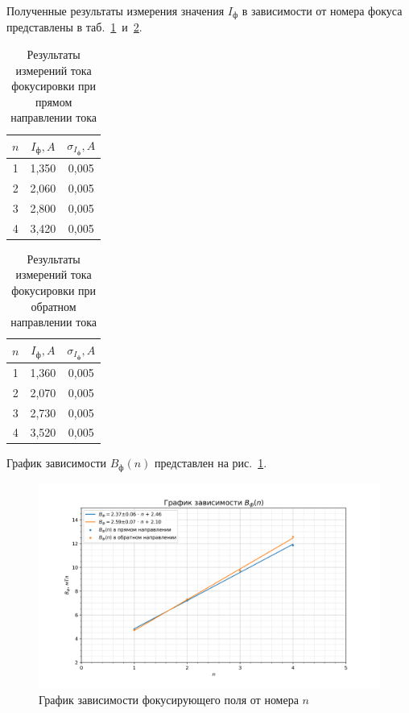 \documentclass[a4paper, 12pt]{article}
\begin{document}
\vspace{6cm}

Полученные результаты измерения значения $I_ф$ в зависимости от номера фокуса представлены в таб.~\ref{tab3}~и~\ref{tab4}.

\begin{table}[h!]
\begin{center}
\begin{tabular}{|c|c|c|}
\hline
$n$ & $I_ф, A$ & $\sigma_{I_ф}, A$ \\ [0.1cm] \hline
1   & 1,350  & 0,005   \\ \hline
2   & 2,060  & 0,005   \\ \hline
3   & 2,800  & 0,005   \\ \hline
4   & 3,420  & 0,005   \\ \hline
\end{tabular}
\end{center}
\caption{Результаты измерений тока фокусировки при прямом направлении тока}
\label{tab3}
\end{table}

\begin{table}[h!]
\begin{center}
\begin{tabular}{|c|c|c|}
\hline
$n$ & $I_ф, A$ & $\sigma_{I_ф}, A$ \\ [0.1cm] \hline
1   & 1,360  & 0,005   \\ \hline
2   & 2,070  & 0,005   \\ \hline
3   & 2,730  & 0,005   \\ \hline
4   & 3,520  & 0,005   \\ \hline
\end{tabular}
\end{center}
\caption{Результаты измерений тока фокусировки при обратном направлении тока}
\label{tab4}
\end{table}

График зависимости $B_{ф}(n)$ представлен на рис.~\ref{ris3}.

\begin{figure}[h!]
\begin{flushleft}
    \includegraphics[scale=0.7]{3.3.1_2.png}
\end{flushleft}
\caption{График зависимости фокусирующего поля от номера $n$}
\label{ris3}
\end{figure}
\end{document}

